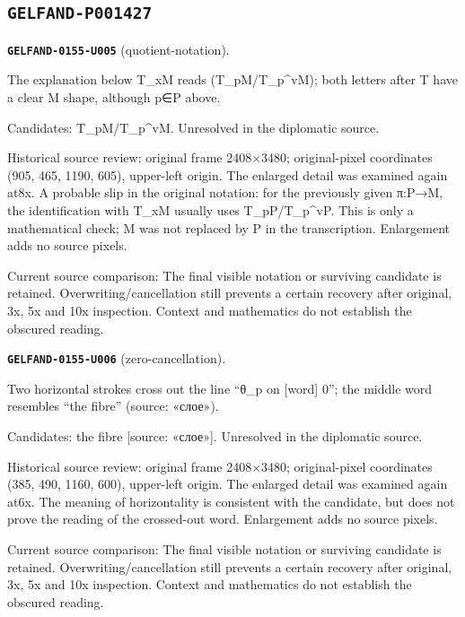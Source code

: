 \subsection*{\texttt{GELFAND-P001427}}
\par\noindent\leavevmode{}\label{GELFAND-0155-U005}\label{GELFAND-P001427:quotient-notation}\textbf{\texttt{GELFAND-0155-U005}} (quotient-notation).\nopagebreak[4]\par
The explanation below T\_xM reads (T\_pM/T\_p\textasciicircum{}vM); both letters after T have a clear M shape, although p∈P above.\par
Candidates: T\_pM/T\_p\textasciicircum{}vM. Unresolved in the diplomatic source.\par
Historical source review: original frame 2408×3480; original-pixel coordinates (905, 465, 1190, 605), upper-left origin. The enlarged detail was examined again at8x. A probable slip in the original notation: for the previously given π:P→M, the identification with T\_xM usually uses T\_pP/T\_p\textasciicircum{}vP. This is only a mathematical check; M was not replaced by P in the transcription. Enlargement adds no source pixels.\par
Current source comparison: The final visible notation or surviving candidate is retained. Overwriting/cancellation still prevents a certain recovery after original, 3x, 5x and 10x inspection. Context and mathematics do not establish the obscured reading.\par
\medskip
\par\noindent\leavevmode{}\label{GELFAND-0155-U006}\label{GELFAND-P001427:zero-cancellation}\textbf{\texttt{GELFAND-0155-U006}} (zero-cancellation).\nopagebreak[4]\par
Two horizontal strokes cross out the line “θ\_p on [word] 0”; the middle word resembles “the fibre” (source: «слое»).\par
Candidates: the fibre [source: «слое»]. Unresolved in the diplomatic source.\par
Historical source review: original frame 2408×3480; original-pixel coordinates (385, 490, 1160, 600), upper-left origin. The enlarged detail was examined again at6x. The meaning of horizontality is consistent with the candidate, but does not prove the reading of the crossed-out word. Enlargement adds no source pixels.\par
Current source comparison: The final visible notation or surviving candidate is retained. Overwriting/cancellation still prevents a certain recovery after original, 3x, 5x and 10x inspection. Context and mathematics do not establish the obscured reading.\par
